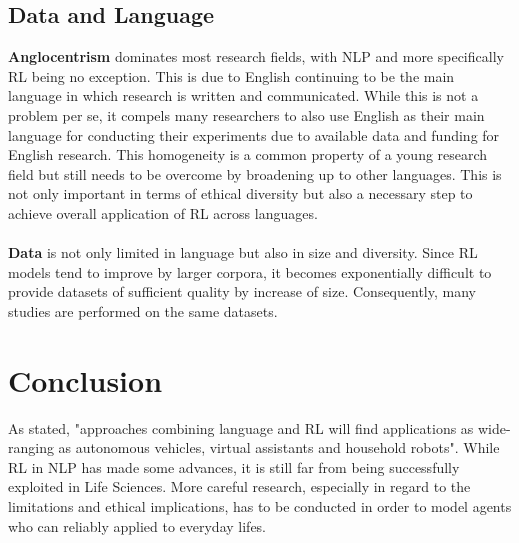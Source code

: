 \documentclass[11pt,a4paper]{article}
\begin{document}
\subsection{Data and Language}
\textbf{Anglocentrism} dominates most research fields, with NLP and more specifically RL being no exception. This is due to English continuing to be the main language in which research is written and communicated. While this is not a problem per se, it compels many researchers to also use English as their main language for conducting their experiments due to available data and funding for English research. This homogeneity is a common property of a young research field but still needs to be overcome by broadening up to other languages. This is not only important in terms of ethical diversity but also a necessary step to achieve overall application of RL across languages. \\\\
\textbf{Data} is not only limited in language but also in size and diversity. Since RL models tend to improve by larger corpora, it becomes exponentially difficult to provide datasets of sufficient quality by increase of size. Consequently, many studies are performed on the same datasets.


\section{Conclusion}
As  \citet{ijcai2019} stated, "approaches combining language and RL will find applications as wide-ranging as autonomous vehicles, virtual assistants and household robots". While RL in NLP has made some advances, it is still far from being successfully exploited in Life Sciences. More careful research, especially in regard to the limitations and ethical implications, has to be conducted in order to model agents who can reliably applied to everyday lifes. 

\newpage

\end{document}
